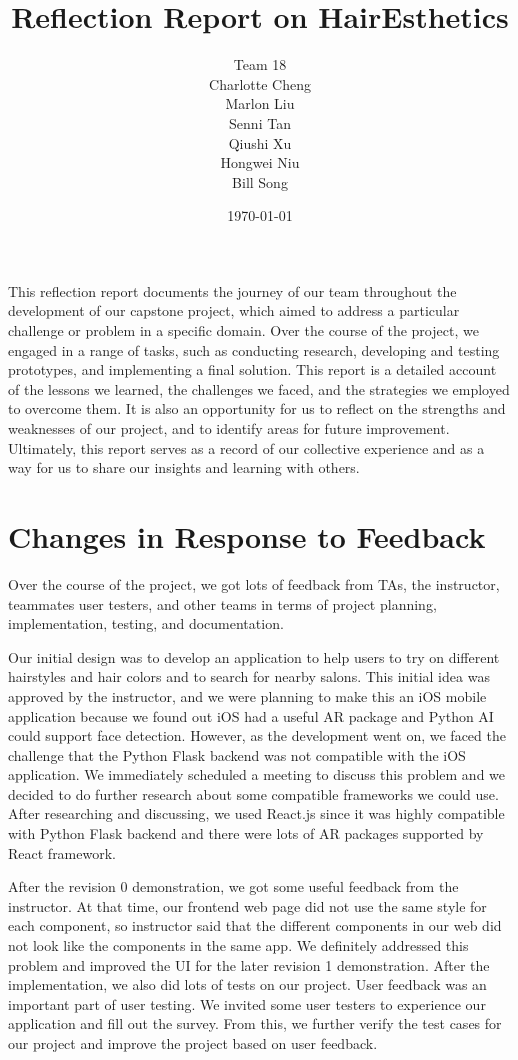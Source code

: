 \documentclass{article}
\title{Reflection Report on HairEsthetics}
\author{Team 18 \\ Charlotte Cheng
        \\ Marlon Liu
        \\ Senni Tan
        \\ Qiushi Xu
        \\ Hongwei Niu
        \\ Bill Song}
\date{\today}
\begin{document}
\maketitle
This reflection report documents the journey of our team throughout the development of our capstone project, which aimed to address a particular challenge or problem in a specific domain. Over the course of the project, we engaged in a range of tasks, such as conducting research, developing and testing prototypes, and implementing a final solution. This report is a detailed account of the lessons we learned, the challenges we faced, and the strategies we employed to overcome them. It is also an opportunity for us to reflect on the strengths and weaknesses of our project, and to identify areas for future improvement. Ultimately, this report serves as a record of our collective experience and as a way for us to share our insights and learning with others.

\section{Changes in Response to Feedback}

Over the course of the project, we got lots of feedback from TAs, the instructor, teammates user testers, and other teams in terms of project planning, implementation, testing, and documentation.

Our initial design was to develop an application to help users to try on different hairstyles and hair colors and to search for nearby salons. This initial idea was approved by the instructor, and we were planning to make this an iOS mobile application because we found out iOS had a useful AR package and Python AI could support face detection. However, as the development went on, we faced the challenge that the Python Flask backend was not compatible with the iOS application. We immediately scheduled a meeting to discuss this problem and we decided to do further research about some compatible frameworks we could use. After researching and discussing, we used React.js since it was highly compatible with Python Flask backend and there were lots of AR packages supported by React framework. 

After the revision 0 demonstration, we got some useful feedback from the instructor. At that time, our frontend web page did not use the same style for each component, so instructor said that the different components in our web did not look like the components in the same app. We definitely addressed this problem and improved the UI for the later revision 1 demonstration. After the implementation, we also did lots of tests on our project. User feedback was an important part of user testing. We invited some user testers to experience our application and fill out the survey. From this, we further verify the test cases for our project and improve the project based on user feedback.
\end{document}
